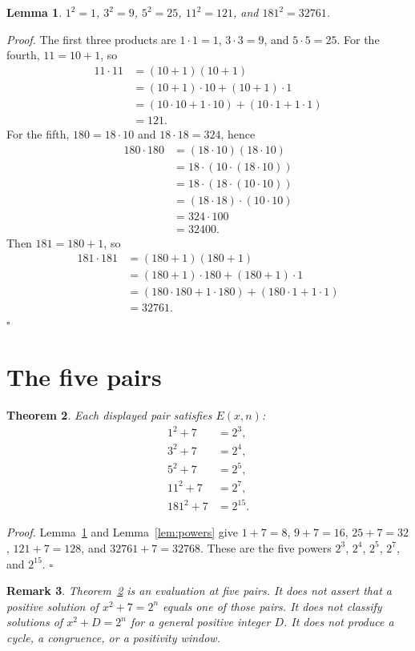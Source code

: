 \documentclass[11pt,letterpaper]{article}
\newtheorem{theorem}{Theorem}
\newtheorem{lemma}[theorem]{Lemma}
\newtheorem{remark}[theorem]{Remark}
\newenvironment{proof}{\noindent\textit{Proof.}}{\hfill\(\square\)}
\begin{document}
\begin{lemma}
\label{lem:squares}
\(1^{2}=1\), \(3^{2}=9\), \(5^{2}=25\), \(11^{2}=121\), and \(181^{2}=32761\).
\end{lemma}

\begin{proof}
The first three products are \(1\cdot 1=1\), \(3\cdot 3=9\), and \(5\cdot 5=25\). For the fourth, \(11=10+1\), so
\begin{align*}
11\cdot 11
&=(10+1)(10+1)\\
&=(10+1)\cdot 10+(10+1)\cdot 1\\
&=(10\cdot 10+1\cdot 10)+(10\cdot 1+1\cdot 1)\\
&=121.
\end{align*}
For the fifth, \(180=18\cdot 10\) and \(18\cdot 18=324\), hence
\begin{align*}
180\cdot 180
&=(18\cdot 10)(18\cdot 10)\\
&=18\cdot(10\cdot(18\cdot 10))\\
&=18\cdot(18\cdot(10\cdot 10))\\
&=(18\cdot 18)\cdot(10\cdot 10)\\
&=324\cdot 100\\
&=32400.
\end{align*}
Then \(181=180+1\), so
\begin{align*}
181\cdot 181
&=(180+1)(180+1)\\
&=(180+1)\cdot 180+(180+1)\cdot 1\\
&=(180\cdot 180+1\cdot 180)+(180\cdot 1+1\cdot 1)\\
&=32761.
\end{align*}
\end{proof}

\section{The five pairs}

\begin{theorem}
\label{thm:displayed}
Each displayed pair satisfies \(E(x,n)\):
\begin{align*}
1^{2}+7&=2^{3},\\
3^{2}+7&=2^{4},\\
5^{2}+7&=2^{5},\\
11^{2}+7&=2^{7},\\
181^{2}+7&=2^{15}.
\end{align*}
\end{theorem}

\begin{proof}
Lemma~\ref{lem:squares} and Lemma~\ref{lem:powers} give
\(1+7=8\), \(9+7=16\), \(25+7=32\), \(121+7=128\), and \(32761+7=32768\).
These are the five powers \(2^{3}\), \(2^{4}\), \(2^{5}\), \(2^{7}\), and \(2^{15}\).
\end{proof}

\begin{remark}
Theorem~\ref{thm:displayed} is an evaluation at five pairs.
It does not assert that a positive solution of \(x^{2}+7=2^{n}\) equals one of those pairs.
It does not classify solutions of \(x^{2}+D=2^{n}\) for a general positive integer \(D\).
It does not produce a cycle, a congruence, or a positivity window.
\end{remark}
\end{document}
